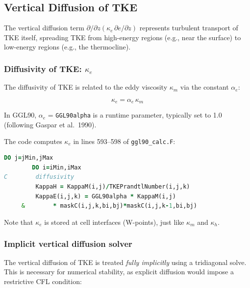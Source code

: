 \documentclass[12pt,letterpaper]{article}
\begin{document}
\subsection{Vertical Diffusion of TKE}
\label{sec:tke_diffusion}

The vertical diffusion term $\partial/\partial z (\kappa_e \, \partial e / \partial z)$ represents turbulent transport of TKE itself, spreading TKE from high-energy regions (e.g., near the surface) to low-energy regions (e.g., the thermocline).

\subsubsection{Diffusivity of TKE: $\kappa_e$}

The diffusivity of TKE is related to the eddy viscosity $\kappa_m$ via the constant $\alpha_e$:

\begin{equation}
\kappa_e = \alpha_e \, \kappa_m
\label{eq:kappa_e}
\end{equation}

In GGL90, $\alpha_e$ = \verb|GGL90alpha| is a runtime parameter, typically set to 1.0 (following Gaspar et al.\ 1990).

The code computes $\kappa_e$ in lines 593--598 of \verb|ggl90_calc.F|:

\begin{lstlisting}[language=Fortran,caption={(ggl90\_calc.F:L593--598) Diffusivity of TKE}]
       DO j=jMin,jMax
        DO i=iMin,iMax
C        diffusivity
         KappaH = KappaM(i,j)/TKEPrandtlNumber(i,j,k)
         KappaE(i,j,k) = GGL90alpha * KappaM(i,j)
     &        * maskC(i,j,k,bi,bj)*maskC(i,j,k-1,bi,bj)
\end{lstlisting}

Note that $\kappa_e$ is stored at cell interfaces (W-points), just like $\kappa_m$ and $\kappa_h$.

\subsubsection{Implicit vertical diffusion solver}

The vertical diffusion of TKE is treated \emph{fully implicitly} using a tridiagonal solve. This is necessary for numerical stability, as explicit diffusion would impose a restrictive CFL condition:
\end{document}
